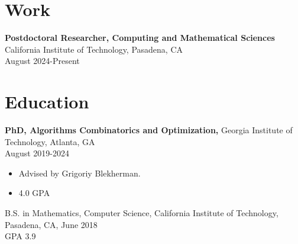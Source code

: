 \documentclass[margin]{res}
\begin{document}
 
 

\begin{resume} 

\section{Work}
 {\bf Postdoctoral Researcher, Computing and Mathematical Sciences} California Institute of Technology, Pasadena, CA\\ August 2024-Present

\section{Education} 
 {\bf PhD, Algorithms Combinatorics and Optimization,} Georgia Institute of Technology, Atlanta, GA\\ August 2019-2024
 \begin{itemize} \itemsep -2pt  %
 \item Advised by Grigoriy Blekherman.
 \item 4.0 GPA
 \end{itemize}

B.S. in Mathematics, Computer Science, California Institute of Technology, Pasadena, CA, June 2018 \\
GPA 3.9


\end{resume}
\end{document}
